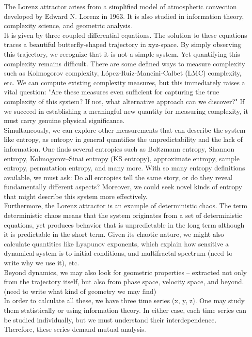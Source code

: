 \documentclass[%
reprint,
amsmath,amssymb,
aps,
floatfix,
]{revtex4-2}
\begin{document}
	The Lorenz attractor arises from a simplified model of atmospheric convection developed by Edward N. Lorenz in 1963. It is also studied in information theory, complexity science, and geometric analysis.\\
	It is given by three coupled differential equations. The solution to these equations traces a beautiful butterfly-shaped trajectory in xyz-space. By simply observing this trajectory, we recognize that it is not a simple system. Yet quantifying this complexity remains difficult. There are some defined ways to measure complexity such as Kolmogorov complexity, López-Ruiz-Mancini-Calbet (LMC) complexity, etc. 
	We can compute existing complexity measures, but this immediately raises a vital question: "Are these measures even sufficient for capturing the true complexity of this system? If not, what alternative approach can we discover?"
	If we succeed in establishing a meaningful new quantity for measuring complexity, it must carry genuine physical significance.\\
	Simultaneously, we can explore other measurements that can describe the system like entropy, as entropy in general quantifies the unpredictability and the lack of information. One finds several entropies such as Boltzmann entropy, Shannon entropy, Kolmogorov–Sinai entropy (KS entropy), approximate entropy, sample entropy, permutation entropy, and many more. With so many entropy definitions available, we must ask: Do all entropies tell the same story, or do they reveal fundamentally different aspects? Moreover, we could seek novel kinds of entropy that might describe this system more effectively.\\
	Furthermore, the Lorenz attractor is an example of deterministic chaos. The term deterministic chaos means that the system originates from a set of deterministic equations, yet produces behavior that is unpredictable in the long term although it is predictable in the short term. Given its chaotic nature, we might also calculate quantities like Lyapunov exponents, which explain how sensitive a dynamical system is to initial conditions, and multifractal spectrum (need to write why we use it), etc.\\
	Beyond dynamics, we may also look for geometric properties – extracted not only from the trajectory itself, but also from phase space, velocity space, and beyond. (need to write what kind of geometry we may find)\\
	In order to calculate all these, we have three time series (x, y, z). One may study them statistically or using information theory. In either case, each time series can be studied individually, but we must understand their interdependence. Therefore, these series demand mutual analysis.\\
\end{document}
